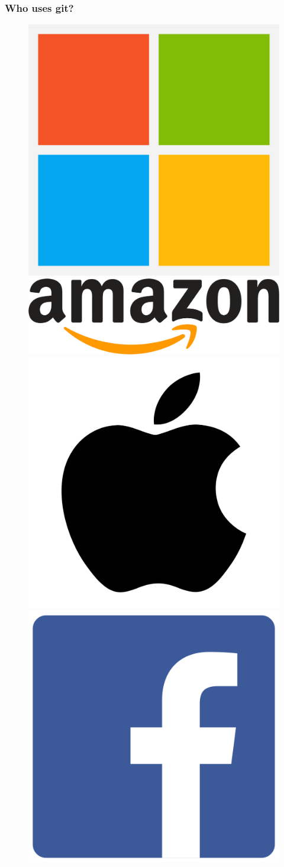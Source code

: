\documentclass[unknownkeysallowed]{beamer}
\begin{document}
\begin{frame}
    \frametitle{Who uses git?}
    \vspace{.5cm}
        \begin{figure}
                \begin{center}
                    \includegraphics[width = .4\linewidth]{assets/logos/microsoft_logo}
                \end{center}
            \endminipage
                \begin{center}
                    \includegraphics[width = .4\linewidth]{assets/logos/amazon_logo}
                \end{center}
            \endminipage
                \begin{center}
                    \includegraphics[width = .4\linewidth]{assets/logos/apple_logo}
                \end{center}
            \endminipage
                \begin{center}
                    \includegraphics[width = .4\linewidth]{assets/logos/facebook_logo}

\end{center}
\end{figure}
\end{frame}
\end{document}
